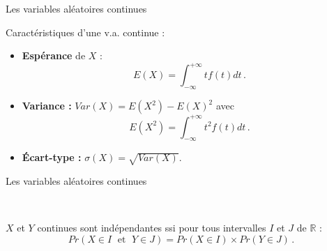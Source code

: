 \documentclass{beamer}
\newcommand{\R}{\mathbb{R}}
\begin{document}

\begin{frame}{Les variables aléatoires continues}

{\Large Caractéristiques d'une v.a. continue :}


\begin{itemize}
\item {\bf Espérance}  de $X$ :
$$
E(X)=\int_{-\infty}^{+\infty} tf(t) dt\,.
$$

\item {\bf Variance :} $Var(X)=E(X^2)-E(X)^2$ avec $$E(X^2)=\int_{-\infty}^{+\infty} t^2f(t) dt\,.$$

\item {\bf Écart-type :} $\sigma(X)=\sqrt{Var(X)}$.

\end{itemize}

\end{frame}



\begin{frame}{Les variables aléatoires continues}


\

 $X$ et $Y$ continues sont indépendantes ssi pour tous intervalles $I$ et $J$ de $\R$ :
$$Pr(X\in I\;{\mbox { et }}\; Y\in J)=Pr(X\in I)\times Pr(Y\in J)\,.$$


\end{frame}
\end{document}
